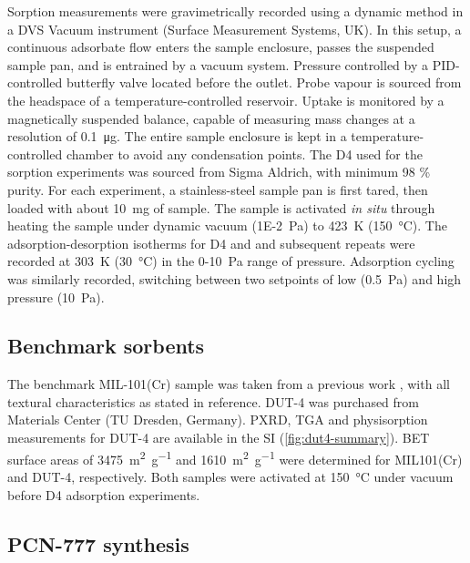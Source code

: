 Sorption measurements were gravimetrically recorded using a dynamic method in a
DVS Vacuum instrument (Surface Measurement Systems, UK). In this setup, a
continuous adsorbate flow enters the sample enclosure, passes the suspended
sample pan, and is entrained by a vacuum system. Pressure controlled by a
PID-controlled butterfly valve located before the outlet. Probe vapour is
sourced from the headspace of a temperature-controlled reservoir. Uptake is
monitored by a magnetically suspended balance, capable of measuring mass changes
at a resolution of \SI{0.1}{\micro\gram}. The entire sample enclosure is kept in
a temperature-controlled chamber to avoid any condensation points. The D4 used
for the sorption experiments was sourced from Sigma Aldrich, with minimum 98 \%
purity. For each experiment, a stainless-steel sample pan is first tared, then
loaded with about \SI{10}{\milli\gram} of sample. The sample is activated
\emph{in situ} through heating the sample under dynamic vacuum
(\SI{1E-2}{\pascal}) to \SI{423}{\kelvin} (\SI{150}{\degreeCelsius}). The
adsorption-desorption isotherms for D4 and  and subsequent repeats were
recorded at \SI{303}{\kelvin} (\SI{30}{\degreeCelsius}) in the
0-\SI{10}{\pascal} range of pressure. Adsorption cycling was similarly recorded,
switching between two setpoints of low (\SI{0.5}{\pascal}) and high pressure
(\SI{10}{\pascal}).

\subsection{Benchmark sorbents}\label{methodology-benchmark-sorbents}

The benchmark MIL-101(Cr) sample was taken from a previous work
\citep{pillaiCapturePerformancesHybrid2017}, with all textural characteristics
as stated in reference. DUT-4 was purchased from Materials Center (TU Dresden,
Germany). PXRD, TGA and  physisorption measurements for DUT-4 are
available in the SI (\cref{fig:dut4-summary}). BET surface areas of
\SI{3475}{\metre\squared\per\gram} and \SI{1610}{\metre\squared\per\gram} were
determined for MIL101(Cr) and DUT-4, respectively. Both samples were activated
at \SI{150}{\degreeCelsius} under vacuum before D4 adsorption experiments.

\subsection{PCN-777 synthesis}\label{methodology-pcn777-synthesis}


